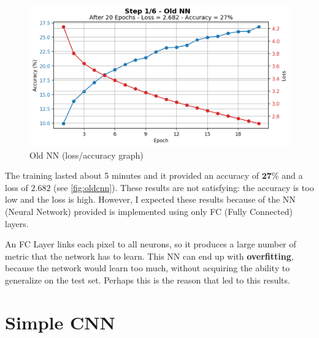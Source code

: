 \documentclass[a4paper, 11pt]{article}
\begin{document}
		\begin{figure}[ht!]
			\centering
			\includegraphics[width=0.65\paperwidth]{img/fig01.png}
			\caption{Old NN (loss/accuracy graph)}
			\label{fig:oldcnn}
		\end{figure}
	
	The training lasted about 5 minutes and it provided an accuracy of $\boldsymbol{27\%}$ and a loss of $\boldsymbol{2.682}$ (see \vref{fig:oldcnn}). These results are not satisfying: the accuracy is too low and the loss is high. However, I expected these results because of the NN (Neural Network) provided is implemented using only FC (Fully Connected) layers.
	
	An FC Layer links each pixel to all neurons, so it produces a large number of metric that the network has to learn. This NN can end up with \textbf{overfitting}, because the network would learn too much, without acquiring the ability to generalize on the test set. Perhaps this is the reason that led to this results.
	
	\section{Simple CNN} \label{sect2}
	
\end{document}
